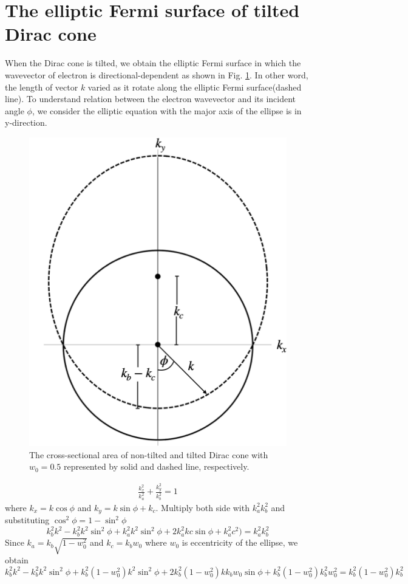 \section{The elliptic Fermi surface of tilted Dirac cone} \label{sec:elliptic fermi surface}
    When the Dirac cone is tilted, we obtain the elliptic Fermi surface in which the wavevector of electron is directional-dependent as shown in Fig. \ref{fig:elliptic fermi surface}.
    In other word, the length of vector $k$ varied as it rotate along the elliptic Fermi surface(dashed line).
    To understand relation between the electron wavevector and its incident angle $\phi$, we consider the elliptic equation with the major axis of the ellipse is in y-direction.
    \begin{figure}[H]
        \centering
        \includegraphics[width = 0.6\linewidth]{fig/elliptic fermi surface.png}
        \caption{The cross-sectional area of non-tilted and tilted Dirac cone with $w_0 = 0.5$ represented by solid and dashed line, respectively.}
        \label{fig:elliptic fermi surface}
    \end{figure}
    \begin{align} \label{eq:elliptic eq}
        \frac{k_x^2}{k_a^2} + \frac{k_y^2}{k_b^2} = 1
    \end{align}
    where $k_x = k\cos{\phi}$ and $k_y = k\sin{\phi} + k_c$. Multiply both side with $k_a^2 k_b^2$ and substituting $\cos^2{\phi} = 1 - \sin^2{\phi}$
    $$
    k_b^2 k^2 -k_b^2 k^2 \sin^2{\phi} + k_a^2k^2 \sin^2{\phi}+2 k_a^2 k c \sin{\phi} +k_a^2 c^2)=k_a^2 k_b^2
    $$
    Since $k_a = k_b \sqrt{1-w_0^2}$ and $k_c = k_b w_0$ where $w_0$ is eccentricity of the ellipse, we obtain
    $$
    k_b^2 k^2 - k_b^2 k^2 \sin^2{\phi} + k_b^2 (1-w_0^2)k^2 \sin^2{\phi}+2 k_b^2 (1-w_0^2) k k_b w_0 \sin{\phi} +k_b^2 (1-w_0^2) k_b^2 w_0^2=k_b^2 (1-w_0^2) k_b^2
    $$

